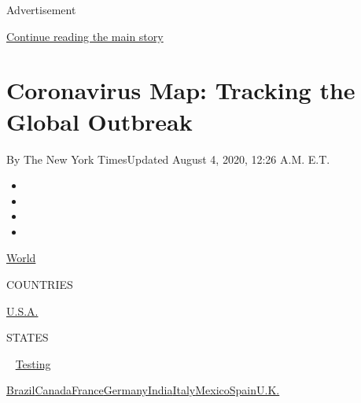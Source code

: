 Advertisement

\protect\hyperlink{after-top}{Continue reading the main story}

\hypertarget{coronavirus-map-tracking-the-global-outbreak}{%
\section{Coronavirus Map: Tracking the Global
Outbreak}\label{coronavirus-map-tracking-the-global-outbreak}}

By The New York TimesUpdated August 4, 2020, 12:26 A.M. E.T.

\begin{itemize}
\item
\item
\item
\item
\end{itemize}

\href{https://www.nytimes.com/interactive/2020/world/coronavirus-maps.html}{World}~

COUNTRIES

\textbar{}
\href{https://www.nytimes.com/interactive/2020/us/coronavirus-us-cases.html}{U.S.A.}~

STATES

~
\href{https://www.nytimes.com/interactive/2020/us/coronavirus-testing.html}{Testing}

\href{https://www.nytimes.com/interactive/2020/world/americas/brazil-coronavirus-cases.html}{Brazil}\href{https://www.nytimes.com/interactive/2020/world/canada/canada-coronavirus-cases.html}{Canada}\href{https://www.nytimes.com/interactive/2020/world/europe/france-coronavirus-cases.html}{France}\href{https://www.nytimes.com/interactive/2020/world/europe/germany-coronavirus-cases.html}{Germany}\href{https://www.nytimes.com/interactive/2020/world/asia/india-coronavirus-cases.html}{India}\href{https://www.nytimes.com/interactive/2020/world/europe/italy-coronavirus-cases.html}{Italy}\href{https://www.nytimes.com/interactive/2020/world/americas/mexico-coronavirus-cases.html}{Mexico}\href{https://www.nytimes.com/interactive/2020/world/europe/spain-coronavirus-cases.html}{Spain}\href{https://www.nytimes.com/interactive/2020/world/europe/united-kingdom-coronavirus-cases.html}{U.K.}

